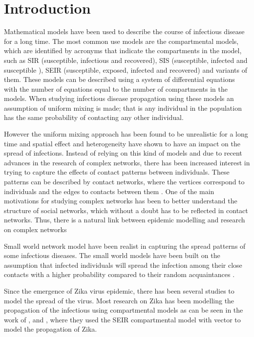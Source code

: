 \chapter{Introduction}
Mathematical models have been used to describe the course of infectious disease for a long time. The most common use
models are the compartmental models, which are identified by acronyms that indicate the compartments in the model, such as SIR (susceptible, infectious and recovered), SIS (susceptible, infected and susceptible ),
SEIR  (susceptible, exposed, infected and recovered) and variants of them. These models can be described using a system of differential equations with the number of equations equal to the number of compartments in the models.
When studying infectious disease propagation using these models an assumption of uniform mixing is made; that is any individual in the population has the same probability of contacting any other individual.
 
However the uniform mixing approach has been found to be unrealistic for a long time
and spatial effect and heterogeneity have shown to have an impact on the spread of infections. Instead of relying on this kind of models and due to recent advances in the research of complex networks, there has been increased interest in trying to capture the effects of contact patterns between individuals. These patterns can be described by contact networks, where the vertices correspond to individuals and the edges to contacts between them  \citep{wallinga1999perspective}. One of the main motivations for studying complex networks has been to better understand the structure of social networks, which without a doubt has to be reflected in contact networks. Thus, there is a natural link between epidemic modelling and research on complex networks \citep{kaski2005modeling}
 
Small world network  model have been realist
in capturing the spread patterns of some infectious diseases. The small world models have been built on the assumption that infected individuals will spread the infection among their close contacts with a higher probability compared to their random acquaintances \citep{newman2002random}.
 
Since the emergence of Zika virus epidemic, there has been several studies to model the spread of the virus. Most research on Zika has been modelling the propagation of the infectious
using compartmental models as can be seen in the work of \cite{1}, \cite{2} and \cite{3}, where they used the SEIR compartmental model with vector to model the propagation of Zika. 

